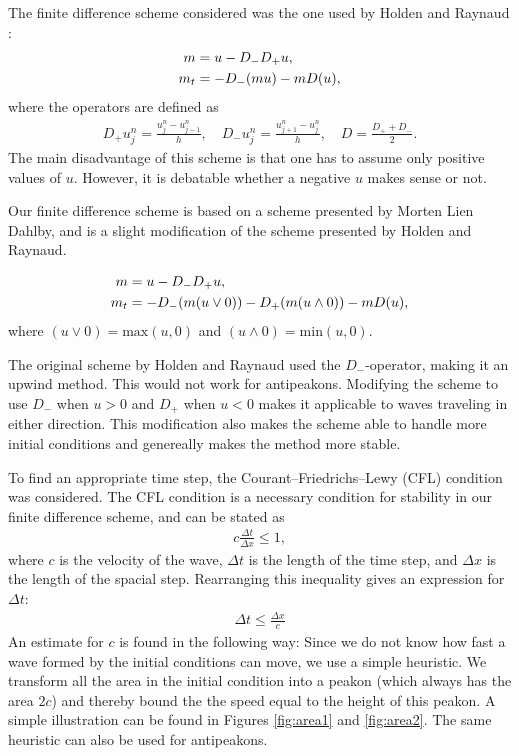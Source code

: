 The finite difference scheme considered was the one used by Holden and Raynaud \cite{holden2006convergence}:
\begin{align}
m &= u - D_{-}D_{+}u, \notag \\ 
m_t &= -D_{-}(mu) - mD(u),
\label{eq:discretized}
\end{align}
where the operators are defined as
\begin{align}
\label{eq:operators}
D_{+}u_{j}^{n} = \frac{u_{j}^{n}-u_{j-1}^{n}}{h},\quad
D_{-}u_{j}^{n} = \frac{u_{j+1}^{n}-u_{j}^{n}}{h},\quad
D = \frac{D_{+}+D_{-}}{2}.
\end{align}
The main disadvantage of this scheme is that one has to assume only positive values of $u$. However, it is debatable whether a negative $u$ makes sense or not.

Our finite difference scheme is based on a scheme presented by Morten Lien Dahlby\cite{dahlby2007geometric}, and is a slight modification of the scheme presented by Holden and Raynaud.

\begin{align}
m &= u - D_{-}D_{+}u, \notag \\ 
m_t &= -D_{-}(m(u \vee 0)) -D_{+}(m(u \wedge 0)) - mD(u), 
\label{eq:modscheme}
\end{align}
where $(u \vee 0) = \text{max}(u,0)$ and $(u \wedge 0) = \text{min}(u,0)$.

The original scheme by Holden and Raynaud used the $D_{-}$-operator, making it an upwind method. This would not work for antipeakons. Modifying the scheme to use  $D_{-}$ when $u > 0$ and $D_{+}$ when $ u < 0$ makes it applicable to waves traveling in either direction. This modification also makes the scheme able to handle more initial conditions and genereally makes the method more stable. 

To find an appropriate time step, the Courant–Friedrichs–Lewy (CFL) condition was considered. The CFL condition is a necessary condition for stability in our finite difference scheme, and can be stated as
\begin{align*}
c\frac{\Delta t}{\Delta x} \leq 1,
\end{align*}
where $c$ is the velocity of the wave, $\Delta t$ is the length of the time step, and $\Delta x$ is the length of the spacial step. Rearranging this inequality gives an expression for $\Delta t$:
\begin{align*}
\Delta t \leq \frac{\Delta x}{c}
\end{align*}
An estimate for $c$ is found in the following way: Since we do not know how fast a wave formed by the initial conditions can move, we use a simple heuristic. We transform all the area in the initial condition into a peakon (which always has the area $2c$) and thereby bound the the speed equal to the height of this peakon. A simple illustration can be found in Figures \ref{fig:area1} and \ref{fig:area2}. The same heuristic can also be used for antipeakons.


